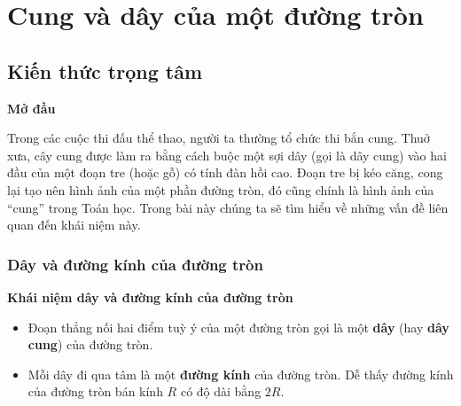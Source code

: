 
\section{Cung và dây của một đường tròn}

\begin{lesson}
    \subsection{Kiến thức trọng tâm}

    \textbf{Mở đầu}

    Trong các cuộc thi đấu thể thao, người ta thường tổ chức thi bắn cung. Thuở xưa, cây cung được làm ra bằng cách buộc một sợi dây (gọi là dây cung) vào hai đầu của một đoạn tre (hoặc gỗ) có tính đàn hồi cao. Đoạn tre bị kéo căng, cong lại tạo nên hình ảnh của một phần đường tròn, đó cũng chính là hình ảnh của ``cung'' trong Toán học. Trong bài này chúng ta sẽ tìm hiểu về những vấn đề liên quan đến khái niệm này.


    \subsubsection{Dây và đường kính của đường tròn}

    \textbf{Khái niệm dây và đường kính của đường tròn}

    \begin{itemize}
        \item Đoạn thẳng nối hai điểm tuỳ ý của một đường tròn gọi là một \textbf{dây} (hay \textbf{dây cung}) của đường tròn.
        \item Mỗi dây đi qua tâm là một \textbf{đường kính} của đường tròn. Dễ thấy đường kính của đường tròn bán kính $R$ có độ dài bằng $2R$.
    \end{itemize}


\end{lesson}
